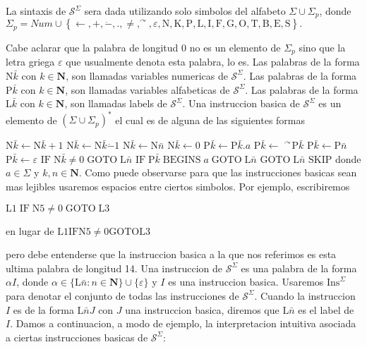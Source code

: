 La sintaxis de \(\mathcal{S}^{\Sigma }\) sera dada utilizando solo simbolos del alfabeto \(\Sigma \cup \Sigma _{p}\), donde
\(\displaystyle \Sigma _{p}=Num\cup \left\{ \leftarrow ,+,\dot{-},.,\neq ,^{\curvearrowright },\varepsilon ,\mathrm{N},\mathrm{K},\mathrm{P},\mathrm{L},\mathrm{I}, \mathrm{F},\mathrm{G},\mathrm{O},\mathrm{T},\mathrm{B},\mathrm{E},\mathrm{S} \right\} . \)

Cabe aclarar que la palabra de longitud \(0\) no es un elemento de \(\Sigma _{p} \) sino que la letra griega \(\varepsilon \) que usualmente denota esta palabra, lo es. Las palabras de la forma \(\mathrm{N}\bar{k}\) con \(k\in \mathbf{N}\), son llamadas variables numericas de \(\mathcal{S} ^{\Sigma }\). Las palabras de la forma \(\mathrm{P}\bar{k}\) con \(k\in \mathbf{N }\), son llamadas variables alfabeticas de \(\mathcal{S}^{\Sigma }\). Las palabras de la forma \(\mathrm{L}\bar{k}\) con \(k\in \mathbf{N}\), son llamadas labels de \(\mathcal{S}^{\Sigma }\). Una instruccion basica de \(\mathcal{S}^{\Sigma }\) es un elemento de \((\Sigma \cup \Sigma _{p})^{\ast }\) el cual es de alguna de las siguientes formas

\(\mathrm{N}\bar{k}\leftarrow \mathrm{N}\bar{k}+1\)
\(\mathrm{N}\bar{k}\leftarrow \mathrm{N}\bar{k}\dot{-}1\)
\(\mathrm{N}\bar{k}\leftarrow \mathrm{N}\bar{n}\)
\(\mathrm{N}\bar{k}\leftarrow 0\)
\(\mathrm{P}\bar{k}\leftarrow \mathrm{P}\bar{k}.a\)
\(\mathrm{P}\bar{k}\leftarrow \) \(^{\curvearrowright }\mathrm{P}\bar{k }\)
\(\mathrm{P}\bar{k}\leftarrow \mathrm{P}\bar{n}\)
\(\mathrm{P}\bar{k}\leftarrow \varepsilon \)
\(\mathrm{IF}\;\mathrm{N}\bar{k}\neq 0\;\mathrm{GOTO}\;\mathrm{L} \bar{n}\)
\(\mathrm{IF}\;\mathrm{P}\bar{k}\;\mathrm{BEGINS}\;a\;\mathrm{GOTO}\; \mathrm{L}\bar{n}\)
\(\mathrm{GOTO}\;\mathrm{L}\bar{n}\)
\(\mathrm{SKIP}\)
donde \(a\in \Sigma \) y \(k,n\in \mathbf{N}\). Como puede observarse para que las instrucciones basicas sean mas lejibles usaremos espacios entre ciertos simbolos. Por ejemplo, escribiremos

\(\displaystyle \mathrm{L}1\;\mathrm{IF}\;\mathrm{N}5\neq 0\;\mathrm{GOTO}\;\mathrm{L}3 \)

en lugar de
\(\displaystyle \mathrm{L}1\mathrm{IFN}5\mathrm{\neq }0\mathrm{GOTOL}3 \)

pero debe entenderse que la instruccion basica a la que nos referimos es esta ultima palabra de longitud 14.
Una instruccion de \(\mathcal{S}^{\Sigma }\) es una palabra de la forma \(\alpha I\), donde \(\alpha \in \{\mathrm{L}\bar{n}:n\in \mathbf{N} \}\cup \{\varepsilon \}\) y \(I\) es una instruccion basica. Usaremos \(\mathrm{ Ins}^{\Sigma }\) para denotar el conjunto de todas las instrucciones de \( \mathcal{S}^{\Sigma }\). Cuando la instruccion \(I\) es de la forma \(\mathrm{L} \bar{n}J\) con \(J\) una instruccion basica, diremos que \(\mathrm{L}\bar{n}\) es el label de \(I\). Damos a continuacion, a modo de ejemplo, la interpretacion intuitiva asociada a ciertas instrucciones basicas de \( \mathcal{S}^{\Sigma }\):


